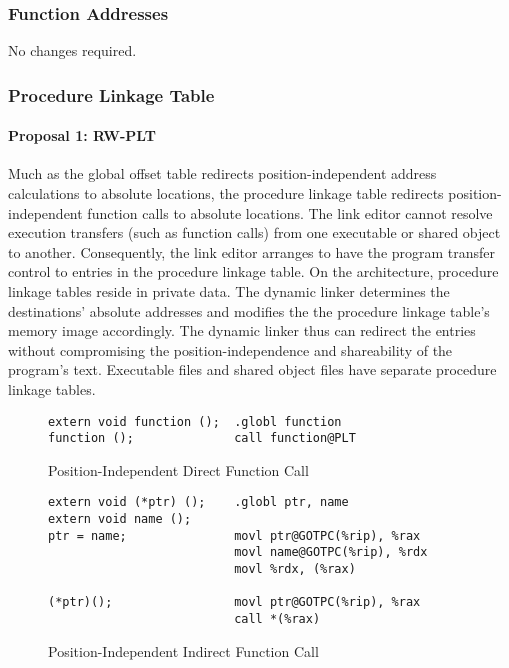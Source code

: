 \subsubsection{Function Addresses}

No changes required.

\subsubsection{Procedure Linkage Table}


\paragraph{Proposal 1: RW-PLT}


Much as the global offset table redirects position-independent address
calculations to absolute locations, the procedure linkage table
redirects position-independent function calls to absolute locations.
The link editor cannot resolve execution transfers (such as function
calls) from one executable or shared object to another.  Consequently,
the link editor arranges to have the program transfer control to
entries in the procedure linkage table.  On the \xARCH architecture,
procedure linkage tables reside in private data.  The dynamic linker
determines the destinations' absolute addresses and modifies the the
procedure linkage table's memory image accordingly.  The dynamic
linker thus can redirect the entries without compromising the
position-independence and shareability of the program's text.
Executable files and shared object files have separate procedure
linkage tables.

\begin{figure}[H]
\caption{Position-Independent Direct Function Call}
\begin{verbatim}
extern void function ();  .globl function
function ();              call function@PLT
\end{verbatim}
\end{figure}

\begin{figure}[H]
\caption{Position-Independent Indirect Function Call}
\begin{verbatim}
extern void (*ptr) ();    .globl ptr, name
extern void name ();
ptr = name;               movl ptr@GOTPC(%rip), %rax
                          movl name@GOTPC(%rip), %rdx
                          movl %rdx, (%rax)

(*ptr)();                 movl ptr@GOTPC(%rip), %rax
                          call *(%rax)
\end{verbatim}
\end{figure}


